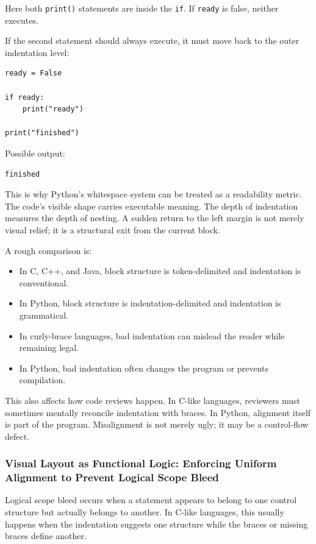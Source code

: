 Here both \texttt{print()} statements are inside the \texttt{if}. If \texttt{ready} is false, neither executes.

If the second statement should always execute, it must move back to the outer indentation level:

\begin{verbatim}
ready = False

if ready:
    print("ready")

print("finished")
\end{verbatim}

Possible output:

\begin{verbatim}
finished
\end{verbatim}

This is why Python's whitespace system can be treated as a readability metric. The code's visible shape carries executable meaning. The depth of indentation measures the depth of nesting. A sudden return to the left margin is not merely visual relief; it is a structural exit from the current block.

A rough comparison is:

\begin{itemize}
    \item In C, C++, and Java, block structure is token-delimited and indentation is conventional.
    \item In Python, block structure is indentation-delimited and indentation is grammatical.
    \item In curly-brace languages, bad indentation can mislead the reader while remaining legal.
    \item In Python, bad indentation often changes the program or prevents compilation.
\end{itemize}

This also affects how code reviews happen. In C-like languages, reviewers must sometimes mentally reconcile indentation with braces. In Python, alignment itself is part of the program. Misalignment is not merely ugly; it may be a control-flow defect.

\subsubsection{Visual Layout as Functional Logic: Enforcing Uniform Alignment to Prevent Logical Scope Bleed}

Logical scope bleed occurs when a statement appears to belong to one control structure but actually belongs to another. In C-like languages, this usually happens when the indentation suggests one structure while the braces or missing braces define another.

